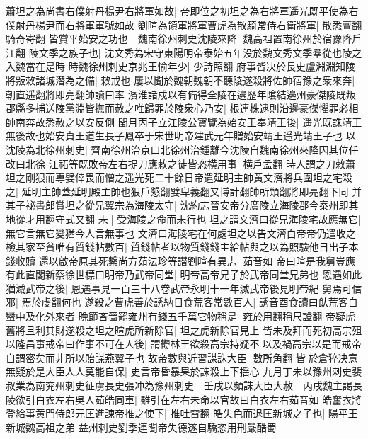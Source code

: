 蕭坦之為尚書右僕射丹楊尹右將軍如故|{
	帝即位之初坦之為右將軍遥光既平使為右僕射丹楊尹而右將軍軍號如故}
劉暄為領軍將軍曹虎為散騎常侍右衛將軍|{
	散悉亶翻騎奇寄翻}
皆賞平始安之功也　魏南徐州刺史沈陵來降|{
	魏高祖置南徐州於宿豫降戶江翻}
陵文季之族子也|{
	沈文秀為宋守東陽明帝泰始五年没於魏文秀文季羣從也陵之入魏當在是時}
時魏徐州刺史京兆王愉年少|{
	少詩照翻}
府事皆决於長史盧淵淵知陵將叛敕諸城潜為之備|{
	敕戒也}
屢以聞於魏朝魏朝不聽陵遂殺將佐帥宿豫之衆來奔|{
	朝直遥翻將即亮翻帥讀曰率}
濱淮諸戍以有備得全陵在邉歷年隂結邉州豪傑陵既叛郡縣多捕送陵黨淵皆撫而赦之唯歸罪於陵衆心乃安|{
	根連株逮則沿邊豪傑懼罪必相帥南奔故悉赦之以安反側}
閠月丙子立江陵公寶覽為始安王奉靖王後|{
	遥光既誅靖王無後故也始安貞王道生長子鳳卒于宋世明帝建武元年贈始安靖王遥光靖王子也}
以沈陵為北徐州刺史|{
	齊南徐州治京口北徐州治鍾離今沈陵自魏南徐州來降因其位任改曰北徐}
江祏等既敗帝左右捉刀應敕之徒皆恣横用事|{
	横戶孟翻}
時人謂之刀敕蕭坦之剛狠而專嬖倖畏而憎之遥光死二十餘日帝遣延明主帥黄文濟將兵圍坦之宅殺之|{
	延明主帥蓋延明殿主帥也狠戶懇翻嬖卑義翻又博計翻帥所類翻將即亮翻下同}
并其子袐書郎賞坦之從兄翼宗為海陵太守|{
	沈約志晉安帝分廣陵立海陵郡今泰州即其地從才用翻守式又翻}
未|{
	受海陵之命而未行也}
坦之謂文濟曰從兄海陵宅故應無它|{
	無它言無它變猶今人言無事也}
文濟曰海陵宅在何處坦之以告文濟白帝帝仍遣收之檢其家至貧唯有質錢帖數百|{
	質錢帖者以物質錢錢主給帖與之以為照驗他日出子本錢收贖}
還以啟帝原其死繫尚方茹法珍等譛劉暄有異志|{
	茹音如}
帝曰暄是我舅豈應有此直閣新蔡徐世標曰明帝乃武帝同堂|{
	明帝高帝兄子於武帝同堂兄弟也}
恩遇如此猶滅武帝之後|{
	恩遇事見一百三十八卷武帝永明十一年滅武帝後見明帝紀}
舅焉可信邪|{
	焉於虔翻何也}
遂殺之曹虎善於誘納日食荒客常數百人|{
	誘音酉食讀曰飤荒客自蠻中及化外來者}
晩節吝嗇罷雍州有錢五千萬它物稱是|{
	雍於用翻稱尺證翻}
帝疑虎舊將且利其財遂殺之坦之暄虎所新除官|{
	坦之虎新除官見上}
皆未及拜而死初高宗殂以隆昌事戒帝曰作事不可在人後|{
	謂欎林王欲殺高宗持疑不以及禍高宗以是而戒帝自謂密矣而非所以貽謀燕翼子也}
故帝數與近習謀誅大臣|{
	數所角翻}
皆於倉猝决意無疑於是大臣人人莫能自保|{
	史言帝昏暴果於誅殺上下揺心}
九月丁未以豫州刺史裴叔業為南兖州刺史征虜長史張冲為豫州刺史　壬戌以頻誅大臣大赦　丙戌魏主謁長陵欲引白衣左右吳人茹皓同車|{
	雖引在左右未命以官故曰白衣左右茹音如}
皓奮衣將登給事黄門侍郎元匡進諫帝推之使下|{
	推吐雷翻}
皓失色而退匡新城之子也|{
	陽平王新城魏高祖之弟}
益州刺史劉季連聞帝失德遂自驕恣用刑嚴酷蜀

